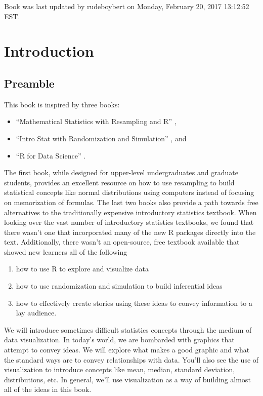 \documentclass[]{tufte-book}
\providecommand{\tightlist}{%
  \setlength{\itemsep}{0pt}\setlength{\parskip}{0pt}}
\theoremstyle{definition}
\theoremstyle{definition}
\theoremstyle{remark}
\begin{document}
Book was last updated by rudeboybert on Monday, February 20, 2017
13:12:52 EST.

\chapter{Introduction}\label{intro}

\section{Preamble}\label{preamble-1}

This book is inspired by three books:

\begin{itemize}
\tightlist
\item
  ``Mathematical Statistics with Resampling and R'' \citep{hester2011},
\item
  ``Intro Stat with Randomization and Simulation'' \citep{isrs2014}, and
\item
  ``R for Data Science'' \citep{rds2016}.
\end{itemize}

The first book, while designed for upper-level undergraduates and
graduate students, provides an excellent resource on how to use
resampling to build statistical concepts like normal distributions using
computers instead of focusing on memorization of formulas. The last two
books also provide a path towards free alternatives to the traditionally
expensive introductory statistics textbook. When looking over the vast
number of introductory statistics textbooks, we found that there wasn't
one that incorporated many of the new R packages directly into the text.
Additionally, there wasn't an open-source, free textbook available that
showed new learners all of the following

\begin{enumerate}
\def\labelenumi{\arabic{enumi}.}
\tightlist
\item
  how to use R to explore and visualize data
\item
  how to use randomization and simulation to build inferential ideas
\item
  how to effectively create stories using these ideas to convey
  information to a lay audience.
\end{enumerate}

We will introduce sometimes difficult statistics concepts through the
medium of data visualization. In today's world, we are bombarded with
graphics that attempt to convey ideas. We will explore what makes a good
graphic and what the standard ways are to convey relationships with
data. You'll also see the use of visualization to introduce concepts
like mean, median, standard deviation, distributions, etc. In general,
we'll use visualization as a way of building almost all of the ideas in
this book.
\end{document}
